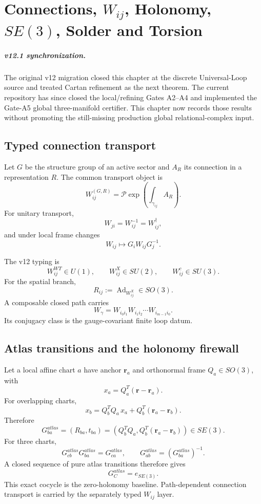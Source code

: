 \chapter[Connections, Holonomy, SE(3), Solder and Torsion]{Connections, $W_{ij}$, Holonomy, $SE(3)$, Solder and Torsion}
\label{ch:v12_connections_holonomy}

\paragraph{v12.1 synchronization.}
The original v12 migration closed this chapter at the discrete Universal-Loop
source and treated Cartan refinement as the next theorem.  The current
repository has since closed the local/refining Gates A2--A4 and implemented the
Gate-A5 global three-manifold certifier.  This chapter now records those results
without promoting the still-missing production global relational-complex input.

\section{Typed connection transport}

Let \(G\) be the structure group of an active sector and \(A_R\) its connection
in a representation \(R\).  The common transport object is
\[
\boxed{
W_{ij}^{(G,R)}
=\mathcal P\exp\!\left(\int_{\gamma_{ij}}A_R\right).
}
\]
For unitary transport,
\[
\boxed{W_{ji}=W_{ij}^{-1}=W_{ij}^{\dagger}},
\]
and under local frame changes
\[
\boxed{W_{ij}\mapsto G_iW_{ij}G_j^{-1}}.
\]

The v12 typing is
\[
\boxed{
W_{ij}^{WT}\in U(1),
\qquad W_{ij}^{X}\in SU(2),
\qquad W_{ij}^{c}\in SU(3).
}
\]
For the spatial branch,
\[
\boxed{R_{ij}:=\operatorname{Ad}_{W_{ij}^{X}}\in SO(3)}.
\]
A composable closed path carries
\[
\boxed{W_\gamma=W_{i_0i_1}W_{i_1i_2}\cdots W_{i_{m-1}i_0}}.
\]
Its conjugacy class is the gauge-covariant finite loop datum.

\section{Atlas transitions and the holonomy firewall}

Let a local affine chart \(a\) have anchor \(\mathbf r_a\) and orthonormal
frame \(Q_a\in SO(3)\), with
\[
x_a=Q_a^T(\mathbf r-\mathbf r_a).
\]
For overlapping charts,
\[
\boxed{x_b=Q_b^TQ_a\,x_a+Q_b^T(\mathbf r_a-\mathbf r_b)}.
\]
Therefore
\[
\boxed{
G_{ba}^{atlas}
=(R_{ba},t_{ba})
=\left(Q_b^TQ_a,Q_b^T(\mathbf r_a-\mathbf r_b)\right)
\in SE(3).
}
\]
For three charts,
\[
G_{cb}^{atlas}G_{ba}^{atlas}=G_{ca}^{atlas},
\qquad
G_{ab}^{atlas}=(G_{ba}^{atlas})^{-1}.
\]
A closed sequence of pure atlas transitions therefore gives
\[
\boxed{G_C^{atlas}=e_{SE(3)}}.
\]
This exact cocycle is the zero-holonomy baseline.  Path-dependent connection
transport is carried by the separately typed \(W_{ij}\) layer.

